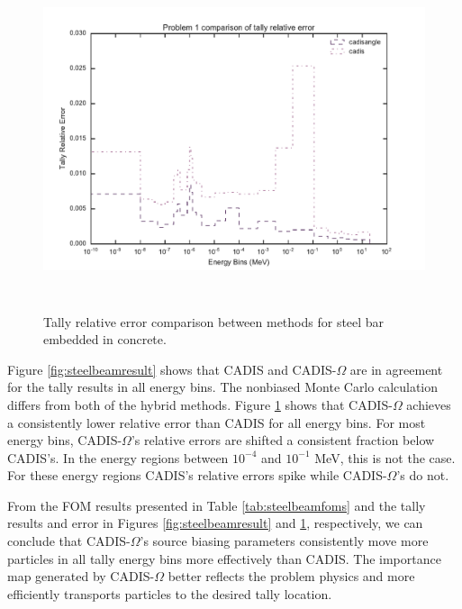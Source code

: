 \begin{figure}[h!]
  \centering
  \includegraphics[height=10cm]{./chapters/characterization_probs/figures/char/prob_1/problem_1_tally_error_compare.pdf}
  \caption[Tally relative error comparison between methods for steel bar
  embedded in concrete.]
  {Tally relative error comparison between methods for steel bar embedded in
  concrete.}
  \label{fig:steelbeamerror}
\end{figure}

Figure \ref{fig:steelbeamresult} shows that CADIS and CADIS-$\Omega$ are in
agreement for the tally results in all energy bins. The nonbiased Monte Carlo
calculation differs from both of the hybrid methods. 
Figure
\ref{fig:steelbeamerror} shows that CADIS-$\Omega$ achieves a
consistently lower relative error than CADIS for all energy bins. For most
energy bins, CADIS-$\Omega$'s relative errors are shifted a consistent fraction
below CADIS's. In the energy regions between $10^{-4}$ and $10^{-1}$ MeV, this is
not the case. For these energy regions CADIS's relative errors spike while
CADIS-$\Omega$'s do not.

%
%

From the FOM results presented in Table \ref{tab:steelbeamfoms} and the tally
results and error in Figures \ref{fig:steelbeamresult} and
\ref{fig:steelbeamerror}, respectively, we can conclude that
CADIS-$\Omega$'s source biasing parameters consistently move more particles in
all tally energy bins more effectively than CADIS.
The importance map generated by CADIS-$\Omega$
better reflects the problem physics and more efficiently transports particles to
the desired tally location.

